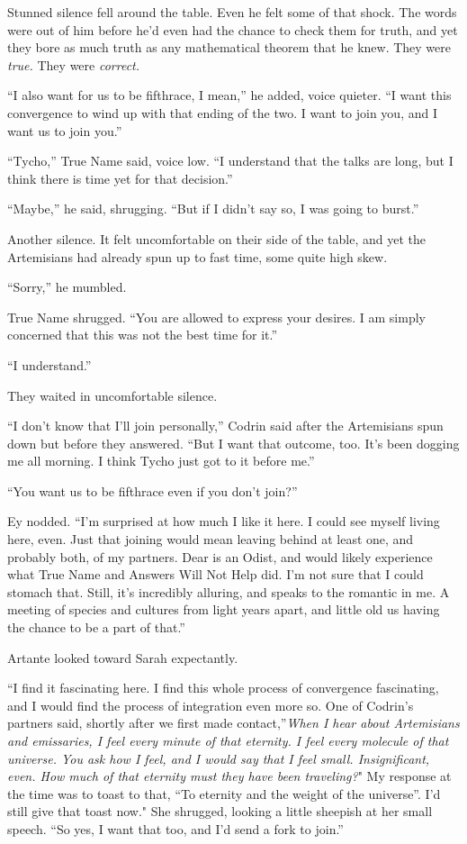 Stunned silence fell around the table. Even he felt some of that shock. The words were out of him before he'd even had the chance to check them for truth, and yet they bore as much truth as any mathematical theorem that he knew. They were \emph{true.} They were \emph{correct.}

``I also want for us to be fifthrace, I mean,'' he added, voice quieter. ``I want this convergence to wind up with that ending of the two. I want to join you, and I want us to join you.''

``Tycho,'' True Name said, voice low. ``I understand that the talks are long, but I think there is time yet for that decision.''

``Maybe,'' he said, shrugging. ``But if I didn't say so, I was going to burst.''

Another silence. It felt uncomfortable on their side of the table, and yet the Artemisians had already spun up to fast time, some quite high skew.

``Sorry,'' he mumbled.

True Name shrugged. ``You are allowed to express your desires. I am simply concerned that this was not the best time for it.''

``I understand.''

They waited in uncomfortable silence.

``I don't know that I'll join personally,'' Codrin said after the Artemisians spun down but before they answered. ``But I want that outcome, too. It's been dogging me all morning. I think Tycho just got to it before me.''

``You want us to be fifthrace even if you don't join?''

Ey nodded. ``I'm surprised at how much I like it here. I could see myself living here, even. Just that joining would mean leaving behind at least one, and probably both, of my partners. Dear is an Odist, and would likely experience what True Name and Answers Will Not Help did. I'm not sure that I could stomach that. Still, it's incredibly alluring, and speaks to the romantic in me. A meeting of species and cultures from light years apart, and little old us having the chance to be a part of that.''

Artante looked toward Sarah expectantly.

``I find it fascinating here. I find this whole process of convergence fascinating, and I would find the process of integration even more so. One of Codrin's partners said, shortly after we first made contact,''\emph{When I hear about Artemisians and emissaries, I feel every minute of that eternity. I feel every molecule of that universe. You ask how I feel, and I would say that I feel small. Insignificant, even. How much of that eternity must they have been traveling?}" My response at the time was to toast to that, ``To eternity and the weight of the universe''. I'd still give that toast now." She shrugged, looking a little sheepish at her small speech. ``So yes, I want that too, and I'd send a fork to join.''

